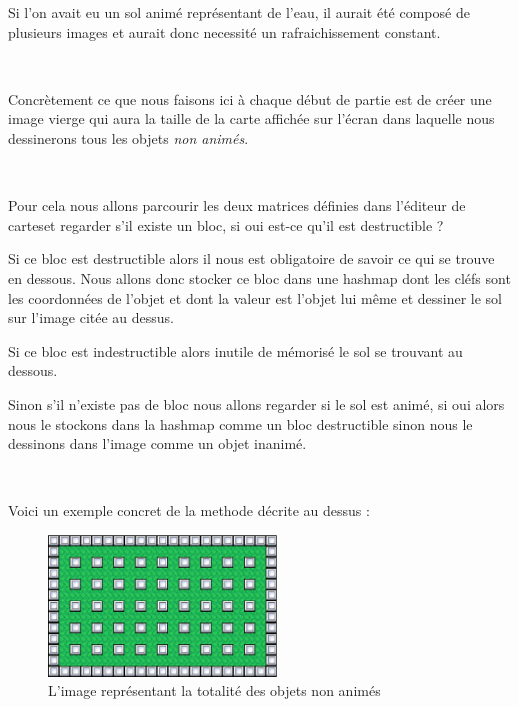 			
			Si l'on avait eu un sol animé représentant de l'eau, il aurait été composé de
			plusieurs images et aurait donc necessité un rafraichissement constant.

			$\,$
			
			Concrètement ce que nous faisons ici à chaque début de partie est de créer
			une image vierge qui aura la taille de la carte affichée sur l'écran dans
			laquelle nous dessinerons tous les objets \emph{non animés}.
			
			$\,$
			
			Pour cela nous allons parcourir les deux matrices définies dans l'éditeur de
			cartes\footnotemark[2] et regarder s'il existe un bloc, si oui est-ce
			qu'il est destructible ?
			
			Si ce bloc est destructible alors il nous est obligatoire de savoir ce qui se
			trouve en dessous.
			Nous allons donc stocker ce bloc dans une hashmap dont les cléfs sont les
			coordonnées de l'objet et dont la valeur est l'objet lui même et dessiner le
			sol sur l'image citée au dessus.
			
			Si ce bloc est indestructible alors inutile de mémorisé le sol se trouvant
			au dessous.
			
			Sinon s'il n'existe pas de bloc nous allons regarder si le sol est animé, si
			oui alors nous le stockons dans la hashmap comme un bloc destructible sinon
			nous le dessinons dans l'image comme un objet inanimé.
			
			$\,$
			
			Voici un exemple concret de la methode décrite au dessus :
				

			\begin{figure}[!h]			
				\begin{center}			
					\includegraphics[width=229px, height=142px]{Developpement/Img/map.eps}
					\caption{L'image représentant la totalité des objets non animés}
				\end{center}
			\end{figure}
			
			$\,$			

